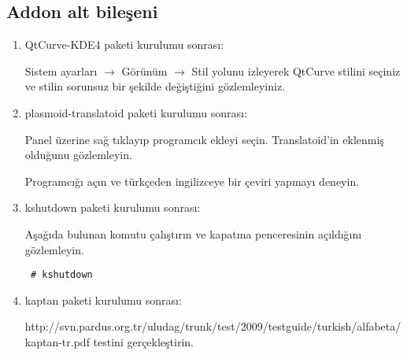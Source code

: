\documentclass[a4paper,10pt]{article}
\begin{document}
\subsection*{Addon alt bileşeni}
\begin{enumerate}
 \item  QtCurve-KDE4 paketi kurulumu sonrası:

Sistem ayarları $\rightarrow$ Görünüm $\rightarrow$ Stil yolunu izleyerek QtCurve stilini seçiniz ve stilin sorunsuz bir şekilde değiştiğini gözlemleyiniz.

 \item plasmoid-translatoid paketi kurulumu sonrası:

Panel üzerine sağ tıklayıp programcık ekleyi seçin. Translatoid'in eklenmiş olduğunu gözlemleyin.

Programcığı açın ve türkçeden ingilizceye bir çeviri yapmayı deneyin.
 \item kshutdown paketi kurulumu sonrası:

Aşağıda bulunan komutu çalıştırın ve kapatma penceresinin açıldığını gözlemleyin.
\begin{verbatim}
 # kshutdown 
\end{verbatim}

 \item kaptan paketi kurulumu sonrası:

  http://svn.pardus.org.tr/uludag/trunk/test/2009/testguide/turkish/alfabeta/kaptan-tr.pdf testini gerçekleştirin.

\end{enumerate}
\end{document}
